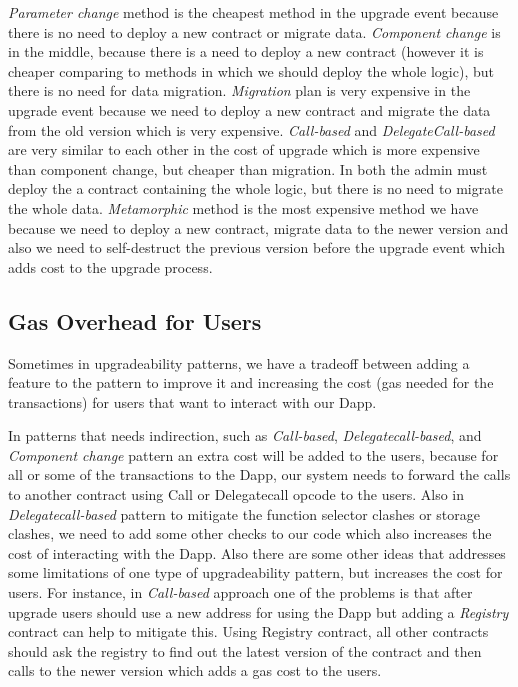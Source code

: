 \textit{Parameter change} method is the cheapest method in the upgrade event because there is no need to deploy a new contract or migrate data.
\textit{Component change} is in the middle, because there is a need to deploy a new contract (however it is cheaper comparing to methods in which we should deploy the whole logic), but there is no need for data migration.
\textit{Migration} plan is very expensive in the upgrade event because we need to deploy a new contract and migrate the data from the old version which is very expensive.
\textit{Call-based} and \textit{DelegateCall-based} are very similar to each other in the cost of upgrade which is more expensive than component change, but cheaper than migration. In both the admin must deploy the a contract containing the whole logic, but there is no need to migrate the whole data.
\textit{Metamorphic} method is the most expensive method we have because we need to deploy a new contract, migrate data to the newer version and also we need to self-destruct the previous version before the upgrade event which adds cost to the upgrade process.


\subsection{Gas Overhead for Users}
Sometimes in upgradeability patterns, we have a tradeoff between adding a feature to the pattern to improve it and increasing the cost (gas needed for the transactions) for users that want to interact with our Dapp.

In patterns that needs indirection, such as \textit{Call-based}, \textit{Delegatecall-based}, and \textit{Component change} pattern an extra cost will be added to the users, because for all or some of the transactions to the Dapp, our system needs to forward the calls to another contract using Call or Delegatecall opcode to the users. 
Also in \textit{Delegatecall-based} pattern to mitigate the function selector clashes or storage clashes, we need to add some other checks to our code which also increases the cost of interacting with the Dapp.
Also there are some other ideas that addresses some limitations of one type of upgradeability pattern, but increases the cost for users. For instance, in \textit{Call-based} approach one of the problems is that after upgrade users should use a new address for using the Dapp but adding a \emph{Registry} contract can help to mitigate this. Using Registry contract, all other contracts should ask the registry to find out the latest version of the contract and then calls to the newer version which adds a gas cost to the users. 

